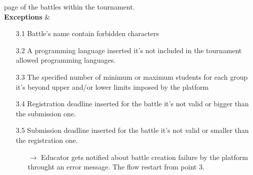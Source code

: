 \documentclass{article}
\begin{document}
{\begin{enumerate}
\begin{xltabular}{\textwidth}
                         page of the battles within the tournament.
                         \\
                        \hline
                        \textbf{Exceptions} &    \begin{itemize}
                                                    \item[3.1] Battle's name contain forbidden characters
                                                    \item[3.2] A programming language inserted it's not included in the tournament
                                                    allowed programming languages.
                                                    \item[3.3] The specified number of minimum or maximum students for each group
                                                    it's beyond upper and/or lower limits imposed by the platform
                                                    \item[3.4] Registration deadline inserted for the battle it's not valid or
                                                    bigger than the submission one.
                                                    \item[3.5] Submission deadline inserted for the battle it's not valid or 
                                                    smaller than the registration one.
                                                    \begin{itemize}
                                                        \item[$\rightarrow$] Educator gets notified about battle creation failure
                                                        by the platform throught an error message. The flow restart from point 3.
                                                    \end{itemize} 
                                                \end{itemize}
                    \end{xltabular}
                    


\end{enumerate}}
\end{document}
